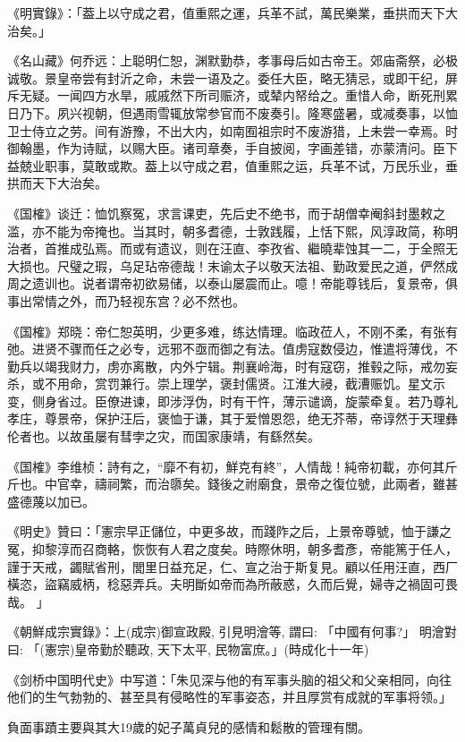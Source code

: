 《明實錄》：「葢上以守成之君，值重熙之運，兵革不試，萬民樂業，垂拱而天下大治矣。」

《名山藏》何乔远：上聪明仁恕，渊默勤恭，孝事母后如古帝王。郊庙斋祭，必极诚敬。景皇帝尝有封沂之命，未尝一语及之。委任大臣，略无猜忌，或即干纪，屏斥无疑。一闻四方水旱，戚戚然下所司赈济，或辇内帑给之。重惜人命，断死刑累日乃下。夙兴视朝，但遇雨雪辄放常参官而不废奏引。隆寒盛暑，或减奏事，以恤卫士侍立之劳。间有游豫，不出大内，如南囿祖宗时不废游猎，上未尝一幸焉。时御翰墨，作为诗赋，以赐大臣。诸司章奏，手自披阅，字画差错，亦蒙清问。臣下益兢业职事，莫敢或欺。葢上以守成之君，值重熙之运，兵革不试，万民乐业，垂拱而天下大治矣。

《国榷》谈迁：恤饥察冤，求言课吏，先后史不绝书，而于胡僧幸阉斜封墨敕之滥，亦不能为帝掩也。当其时，朝多耆德，士敦践履，上恬下熙，风淳政简，称明治者，首推成弘焉。而或有遗议，则在汪直、李孜省、繼曉辈蚀其一二，于全照无大损也。尺璧之瑕，乌足玷帝德哉！末谕太子以敬天法祖、勤政爱民之道，俨然成周之遗训也。说者谓帝初欲易储，以泰山屡震而止。噫！帝能尊钱后，复景帝，俱事出常情之外，而乃轻视东宫？必不然也。

《国榷》郑晓：帝仁恕英明，少更多难，练达情理。临政莅人，不刚不柔，有张有弛。进贤不骤而任之必专，远邪不亟而御之有法。值虏寇数侵边，惟遣将薄伐，不勤兵以竭我财力，虏亦离散，内外宁辑。荆襄岭海，时有寇窃，推毂之际，戒勿妄杀，或不用命，赏罚兼行。崇上理学，褒封儒贤。江淮大祲，截漕赈饥。星文示变，侧身省过。臣僚进谏，即涉浮伪，时有干忤，薄示谴谪，旋蒙牵复。若乃尊礼孝庄，尊景帝，保护汪后，褒恤于谦，其于爱憎恩怨，绝无芥蒂，帝谆然于天理彝伦者也。以故虽屡有彗孛之灾，而国家康靖，有繇然矣。

《国榷》李维桢：詩有之，“靡不有初，鮮克有終”，人情哉！純帝初載，亦何其斤斤也。中官幸，禱祠繁，而治隳矣。錢後之祔廟食，景帝之復位號，此兩者，雖甚盛德蔑以加已。

《明史》贊曰：「憲宗早正儲位，中更多故，而踐阼之后，上景帝尊號，恤于謙之冤，抑黎淳而召商輅，恢恢有人君之度矣。時際休明，朝多耆彥，帝能篤于任人，謹于天戒，蠲賦省刑，閭里日益充足，仁、宣之治于斯复見。顧以任用汪直，西厂橫恣，盜竊威柄，稔惡弄兵。夫明斷如帝而為所蔽惑，久而后覺，婦寺之禍固可畏哉。 」

《朝鮮成宗實錄》：上(成宗)御宣政殿, 引見明澮等, 謂曰: 「中國有何事?」 明澮對曰: 「(憲宗)皇帝勤於聽政, 天下太平, 民物富庶。」(時成化十一年)

《剑桥中国明代史》中写道：「朱见深与他的有军事头脑的祖父和父亲相同，向往他们的生气勃勃的、甚至具有侵略性的军事姿态，并且厚赏有成就的军事将领。」

負面事蹟主要與其大19歲的妃子萬貞兒的感情和鬆散的管理有關。

